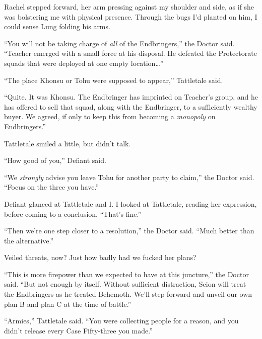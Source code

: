 Rachel stepped forward, her arm pressing against my shoulder and side, as if she was bolstering me with physical presence.  Through the bugs I'd planted on him, I could sense Lung folding his arms.



``You will not be taking charge of \emph{all} of the Endbringers,'' the Doctor said.  ``Teacher emerged with a small force at his disposal.  He defeated the Protectorate squads that were deployed at one empty location\ldots''



``The place Khonsu or Tohu were supposed to appear,'' Tattletale said.



``Quite.  It was Khonsu.  The Endbringer has imprinted on Teacher's group, and he has offered to sell that squad, along with the Endbringer, to a sufficiently wealthy buyer.  We agreed, if only to keep this from becoming a \emph{monopoly }on Endbringers.''



Tattletale smiled a little, but didn't talk.



``How good of you,'' Defiant said.



``We \emph{strongly} advise you leave Tohu for another party to claim,'' the Doctor said.  ``Focus on the three you have.''



Defiant glanced at Tattletale and I.  I looked at Tattletale, reading her expression, before coming to a conclusion.  ``That's fine.''



``Then we're one step closer to a resolution,'' the Doctor said.  ``Much better than the alternative.''



Veiled threats, now?  Just how badly had we fucked her plans?



``This is more firepower than we expected to have at this juncture,'' the Doctor said.  ``But not enough by itself.  Without sufficient distraction, Scion will treat the Endbringers as he treated Behemoth.  We'll step forward and unveil our own plan B and plan C at the time of battle.''



``Armies,'' Tattletale said.  ``You were collecting people for a reason, and you didn't release every Case Fifty-three you made.''




